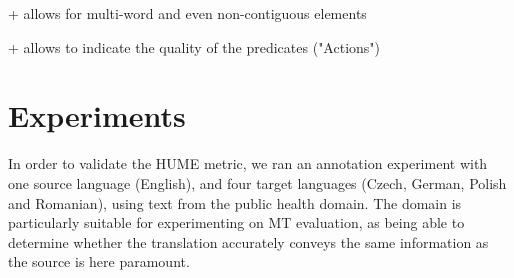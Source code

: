 \documentclass[11pt]{article}
\begin{document}
+ allows for multi-word and even non-contiguous elements

+ allows to indicate the quality of the predicates ("Actions")


% 
% 
% 
% 
% 







\section{Experiments}\label{sec:experiments}


In order to validate the HUME metric, we ran an annotation experiment with one source language (English), and four 
target languages (Czech, German, Polish and Romanian), using text from the public health domain.
The domain is particularly suitable for experimenting on MT evaluation, as being able to determine
whether the translation accurately conveys the same information as the source is here paramount.
\end{document}
